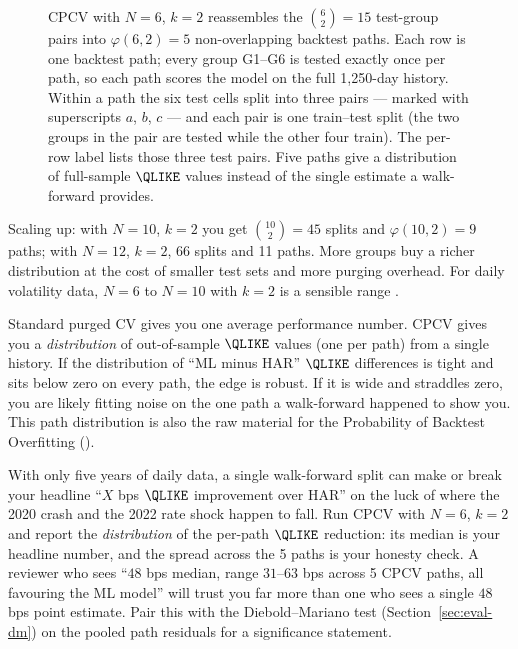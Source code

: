\begin{figure}[ht]
\caption{CPCV with $N=6$, $k=2$ reassembles the $\binom{6}{2}=15$ test-group pairs into $\varphi(6,2)=5$ non-overlapping backtest paths.
Each row is one backtest path; every group G1--G6 is tested exactly once per path, so each path scores the model on the full 1{,}250-day history.
Within a path the six test cells split into three pairs --- marked with superscripts $a$, $b$, $c$ --- and each pair is one train--test split (the two groups in the pair are tested while the other four train).
The per-row label lists those three test pairs.
Five paths give a distribution of full-sample $\QLIKE$ values instead of the single estimate a walk-forward provides.}
\label{fig:ch16-cpcv-paths}
\end{figure}

Scaling up: with $N=10$, $k=2$ you get $\binom{10}{2}=45$ splits and $\varphi(10,2)=9$ paths; with $N=12$, $k=2$, 66 splits and 11 paths.
More groups buy a richer distribution at the cost of smaller test sets and more purging overhead.
For daily volatility data, $N=6$ to $N=10$ with $k=2$ is a sensible range \citep{LopezdePrado2018}.

\begin{keyidea}
Standard purged CV gives you one average performance number.
CPCV gives you a \emph{distribution} of out-of-sample $\QLIKE$ values (one per path) from a single history.
If the distribution of ``ML minus HAR'' $\QLIKE$ differences is tight and sits below zero on every path, the edge is robust.
If it is wide and straddles zero, you are likely fitting noise on the one path a walk-forward happened to show you.
This path distribution is also the raw material for the Probability of Backtest Overfitting ().
\end{keyidea}

\begin{projectconnection}
With only five years of daily data, a single walk-forward split can make or break your headline ``$X$ bps $\QLIKE$ improvement over HAR'' on the luck of where the 2020 crash and the 2022 rate shock happen to fall.
Run CPCV with $N=6$, $k=2$ and report the \emph{distribution} of the per-path $\QLIKE$ reduction: its median is your headline number, and the spread across the 5 paths is your honesty check.
A reviewer who sees ``$48$ bps median, range $31$--$63$ bps across 5 CPCV paths, all favouring the ML model'' will trust you far more than one who sees a single $48$ bps point estimate.
Pair this with the Diebold--Mariano test (Section~\ref{sec:eval-dm}) on the pooled path residuals for a significance statement.
\end{projectconnection}


